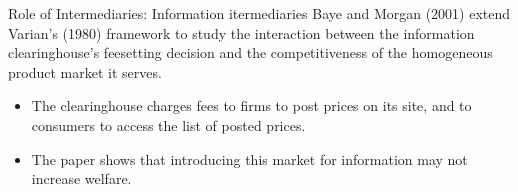\documentclass[aspectratio=169]{beamer}  %
\begin{document}
\begin{frame}{Role of Intermediaries: Information itermediaries}
    Baye and Morgan (2001) extend Varian’s (1980) framework to study the interaction between the information clearinghouse’s feesetting decision and the competitiveness of the homogeneous product market it serves.
    \begin{itemize}
        \item The clearinghouse charges fees to firms to post prices on its site, and to consumers to access the list of posted prices.
        \item The paper shows that introducing this market for information may not increase welfare.
    \end{itemize}
\end{frame}
\end{document}
